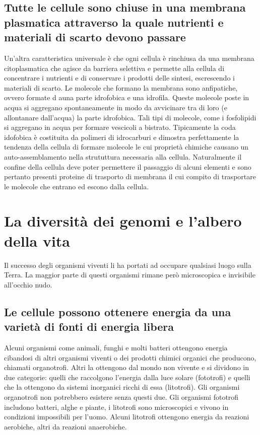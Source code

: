 \subsection{Tutte le cellule sono chiuse in una membrana plasmatica attraverso la quale nutrienti e materiali di scarto devono passare}
Un'altra caratteristica universale \`e che ogni cellula \`e rinchiusa da una membrana citoplasmatica che agisce da barriera selettiva e permette alla cellula di concentrare i nutrienti e
di conservare i prodotti delle sintesi, escrescendo i materiali di scarto. Le molecole che formano la membrana sono anfipatiche, ovvero formate d auna parte idrofobica e una idrofila. 
Queste molecole poste in acqua si aggregano spontaneamente in modo da avvicinare tra di loro (e allontanare dall'acqua) la parte idrofobica. Tali tipi di molecole, come i fosfolipidi si
aggregano in acqua per formare vescicoli a bistrato. Tipicamente la coda idofobica \`e costituita da polimeri di idrocarburi e dimostra perfettamente la tendenza della cellula di formare
molecole le cui propriet\`a chimiche causano un auto-assemblamento nella strututtura necessaria alla cellula. Naturalmente il confine della cellula deve poter permettere il passaggio di 
alcuni elementi e sono pertanto presenti proteine di trasporto di membrana il cui compito di trasportare le molecole che entrano ed escono dalla cellula. 
\section{La diversit\`a dei genomi e l'albero della vita}
Il successo degli organismi viventi li ha portati ad occupare qualsiasi luogo sulla Terra. La maggior parte di questi organismi rimane per\`o microscopica e invisibile all'occhio nudo.
\subsection{Le cellule possono ottenere energia da una variet\`a di fonti di energia libera}
Alcuni organismi come animali, funghi e molti batteri ottengono energia cibandosi di altri organismi viventi o dei prodotti chimici organici che producono, chiamati organotrofi. Altri 
la ottengono dal mondo non vivente e si dividono in due categorie: quelli che raccolgono l'energia dalla luce solare (fototrofi) e quelli che la ottengono da sistemi inorganici ricchi di
essa (litotrofi). Gli organismi organotrofi non potrebbero esistere senza questi due. Gli organismi fototrofi includono batteri, alghe e piante, i litotrofi sono microscopici e vivono
in condizioni impossibili per l'uomo. Alcuni litotrofi ottengono energia da reazioni aerobiche, altri da reazioni anaerobiche. 
